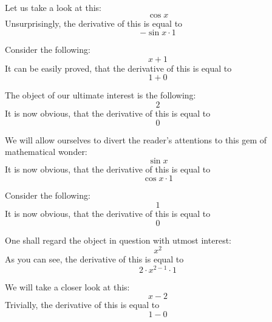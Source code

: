 \documentclass{article}
\begin{document}
Let us take a look at this:
\begin{equation}
\cos x 
\end{equation}
Unsurprisingly, the derivative of this is equal to
\begin{equation}
-\sin x \cdot 1 
\end{equation}

Consider the following:
\begin{equation}
x + 1 
\end{equation}
It can be easily proved, that the derivative of this is equal to
\begin{equation}
1 + 0 
\end{equation}

The object of our ultimate interest is the following:
\begin{equation}
2 
\end{equation}
It is now obvious, that the derivative of this is equal to
\begin{equation}
0 
\end{equation}

We will allow ourselves to divert the reader's attentions to this gem of mathematical wonder:
\begin{equation}
\sin x 
\end{equation}
It is now obvious, that the derivative of this is equal to
\begin{equation}
\cos x \cdot 1 
\end{equation}

Consider the following:
\begin{equation}
1 
\end{equation}
It is now obvious, that the derivative of this is equal to
\begin{equation}
0 
\end{equation}

One shall regard the object in question with utmost interest:
\begin{equation}
x ^{2 } 
\end{equation}
As you can see, the derivative of this is equal to
\begin{equation}
2 \cdot x ^{2 - 1 } \cdot 1 
\end{equation}

We will take a closer look at this:
\begin{equation}
x - 2 
\end{equation}
Trivially, the derivative of this is equal to
\begin{equation}
1 - 0 
\end{equation}
\end{document}
